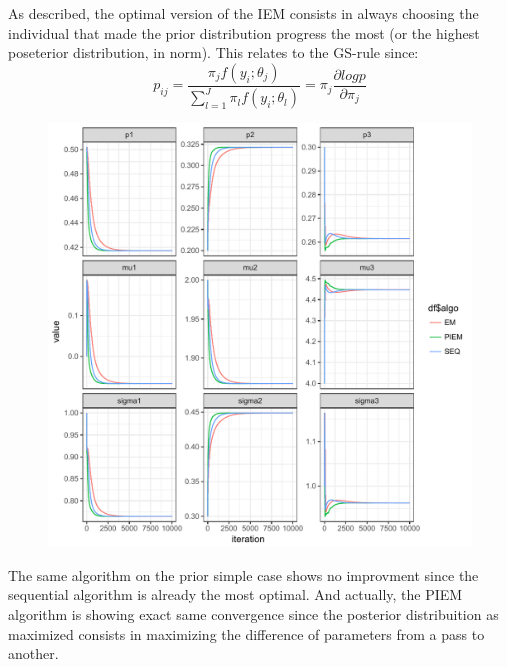 \documentclass[a4paper]{article}
\theoremstyle{plain}
\theoremstyle{plain}
\theoremstyle{definition}
\begin{document}
As described, the optimal version of the IEM consists in always choosing the individual that made the prior distribution progress the most (or the highest poseterior distribution, in norm). This relates to the GS-rule since:
\begin{equation}
p_{ij} = \frac{\pi_jf(y_i;\theta_j)}{\sum_{l=1}^{J}\pi_lf(y_i;\theta_l)} = \pi_j \frac{\partial log p}{\partial \pi_j}
\end{equation}

\begin{figure}[H]
\begin{center}
\includegraphics[scale=0.5]{piem_2gmm.pdf}
\end{center}
\end{figure}


The same algorithm on the prior simple case shows no improvment since the sequential algorithm is already the most optimal. And actually, the PIEM algorithm is showing exact same convergence since the posterior distribuition as maximized consists in maximizing the difference of parameters from a pass to another.
\end{document}
